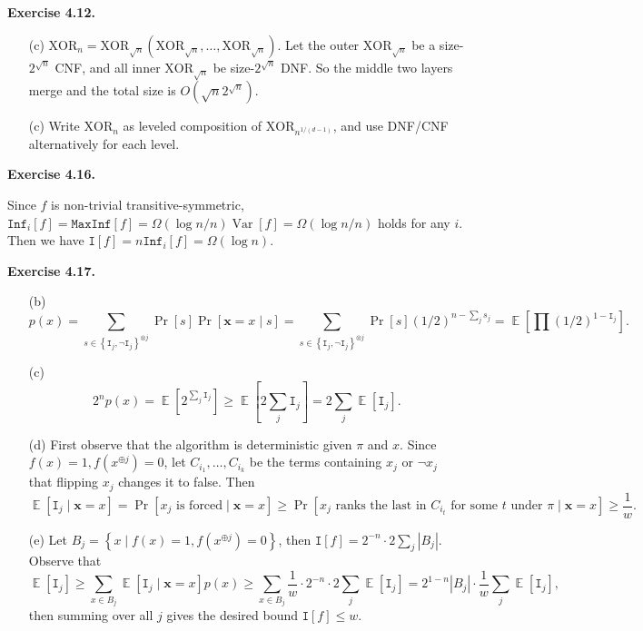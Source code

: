 \documentclass[a4paper]{article}
\newenvironment{exercise}[1]{
	\par
	\noindent\textbf{Exercise #1.}\quad
}{
	\par
	\bigskip
}
\DeclareMathOperator{\E}{\mathbb E}
\DeclareMathOperator{\Var}{\mathrm{Var}}
\newcommand{\pbra}[1]{{\left( #1 \right)}}
\newcommand{\cbra}[1]{{\left\{ #1 \right\}}}
\newcommand{\sbra}[1]{{\left[ #1 \right]}}
\newcommand{\Inf}{\mathtt{Inf}}
\newcommand{\MaxInf}{\mathtt{MaxInf}}
\newcommand{\Itt}{\mathtt{I}}
\begin{document}
\begin{exercise}{4.12}
    \begin{itemize}
        \item[(c)] $\text{XOR}_n=\text{XOR}_{\sqrt n}\pbra{\text{XOR}_{\sqrt n},\ldots,\text{XOR}_{\sqrt n}}$.
            Let the outer $\text{XOR}_{\sqrt n}$ be a size-$2^{\sqrt n}$ CNF, and all inner $\text{XOR}_{\sqrt n}$ be
            size-$2^{\sqrt n}$ DNF. So the middle two layers merge and the total size is $O\pbra{\sqrt n2^{\sqrt n}}$.
        \item[(c)] Write $\text{XOR}_n$ as leveled composition of $\text{XOR}_{n^{1/(d-1)}}$, and use DNF/CNF alternatively for each level.
    \end{itemize}
\end{exercise}

\begin{exercise}{4.16}
    Since $f$ is non-trivial transitive-symmetric, $\Inf_i[f]=\MaxInf[f]=\Omega(\log n/n)\Var[f]=\Omega(\log n/n)$ holds for any $i$.
    Then we have $\Itt[f]=n\Inf_i[f]=\Omega(\log n)$.
\end{exercise}

\begin{exercise}{4.17}
    \begin{itemize}
        \item[(b)]
            $$
            p(x)
            =\sum_{s\in\cbra{\Itt_j,\neg\Itt_j}^{\otimes j}}\Pr[s]\Pr\sbra{\bm x=x\mid s}
            =\sum_{s\in\cbra{\Itt_j,\neg\Itt_j}^{\otimes j}}\Pr[s](1/2)^{n-\sum_j s_j}
            =\E\sbra{\prod(1/2)^{1-\Itt_j}}.
            $$
        \item[(c)]
            $$
            2^np(x)=\E\sbra{2^{\sum_j\Itt_j}}\geq\E\sbra{2\sum_j\Itt_j}=2\sum_j\E\sbra{\Itt_j}.
            $$
        \item[(d)] First observe that the algorithm is deterministic given $\pi$ and $x$.
            Since $f(x)=1,f(x^{\oplus j})=0$, let $C_{i_1},\ldots,C_{i_k}$ be the terms containing $x_j$ or $\neg x_j$ that flipping $x_j$ changes it to false. Then
            $$
            \E\sbra{\Itt_j\mid\bm x=x}=\Pr\sbra{x_j\text{ is forced}\mid\bm x=x}
            \geq\Pr\sbra{x_j\text{ ranks the last in }C_{i_t}\text{ for some }t\text{ under }\pi\mid\bm x=x}
            \geq\frac1w.
            $$
        \item[(e)] Let $B_j=\cbra{x\mid f(x)=1,f(x^{\oplus j})=0}$, then $\Itt[f]=2^{-n}\cdot2\sum_j|B_j|$.
            Observe that
            $$
            \E\sbra{\Itt_j}\geq\sum_{x\in B_j}\E\sbra{\Itt_j\mid\bm x=x}p(x)
            \geq\sum_{x\in B_j}\frac1w\cdot2^{-n}\cdot2\sum_j\E\sbra{\Itt_j}
            =2^{1-n}|B_j|\cdot\frac1w\sum_j\E\sbra{\Itt_j},
            $$
            then summing over all $j$ gives the desired bound $\Itt[f]\leq w$.
    \end{itemize}
\end{exercise}
\end{document}
